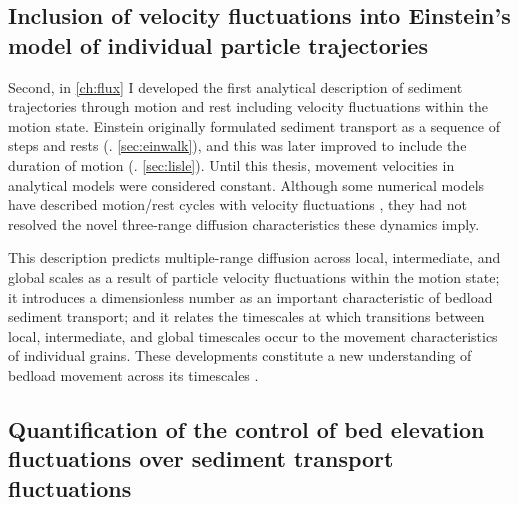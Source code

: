 \subsection{Inclusion of velocity fluctuations into Einstein's model of individual particle trajectories}

Second, in \DIFdelbegin {}\DIFdelend \DIFaddbegin {}\DIFaddend \ref{ch:flux} I developed the first analytical description of sediment trajectories through motion and rest including velocity fluctuations within the motion state.
Einstein originally formulated sediment transport as a sequence of \DIFdelbegin {}\DIFdelend \DIFaddbegin {}\DIFaddend steps and rests (\DIFdelbegin {}\DIFdelend \DIFaddbegin {}\DIFaddend . \ref{sec:einwalk}), and this was later improved to include the duration of motion (\DIFdelbegin {}\DIFdelend \DIFaddbegin {}\DIFaddend . \ref{sec:lisle}).
Until this thesis, movement velocities in analytical models were considered constant\DIFdelbegin {}\DIFdelend \DIFaddbegin {}\DIFaddend .
Although some numerical models have described motion/rest cycles with velocity fluctuations \citep{Fan2016,Bialik2012,Schmeeckle2014}, they had not resolved the novel three-range diffusion characteristics these dynamics imply.

This description predicts multiple-range diffusion across local, intermediate, and global scales as a result of particle velocity fluctuations within the motion state; it introduces a dimensionless \DIFdelbegin {}\DIFdelend \DIFaddbegin {}\DIFaddend number as an important characteristic of bedload sediment transport; and it relates the timescales at which transitions between local, intermediate, and global timescales occur to the movement characteristics of individual grains.
These developments constitute a new understanding of bedload movement across its timescales \DIFaddbegin {}\DIFaddend .

\subsection{Quantification of the control of bed elevation fluctuations over sediment transport fluctuations}

